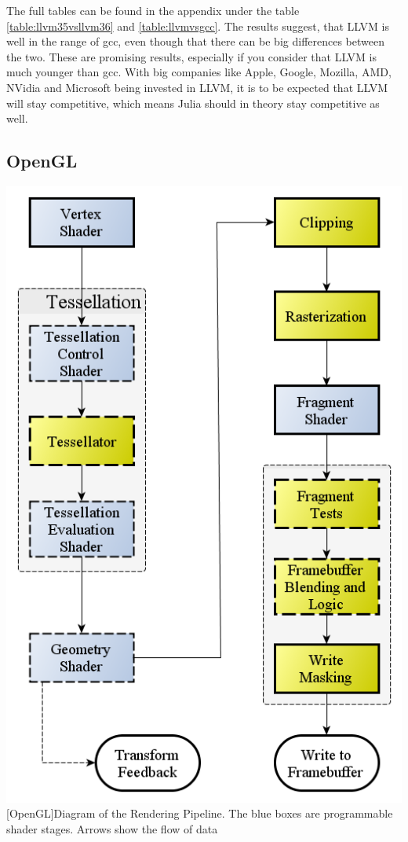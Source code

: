 The full tables can be found in the appendix under the table \ref{table:llvm35vsllvm36} and \ref{table:llvmvsgcc}.
The results suggest, that \ac{LLVM} is well in the range of \ac{gcc}, even though that there can be big differences between the two.
These are promising results, especially if you consider that \ac{LLVM} is much younger than \ac{gcc}. 
With big companies like Apple\cite{GoogleAppleLLVM}, Google\cite{GoogleAppleLLVM}, Mozilla\cite{Rust}, AMD\cite{LLVMAMD}, NVidia\cite{LLVMNvidia} and Microsoft\cite{MicrosoftLLVM} being invested in LLVM, it is to be expected that \ac{LLVM} will stay competitive, which means Julia should in theory stay competitive as well.


\subsection{\ac{OpenGL}}

\vspace{1em}
\begin{minipage}{\linewidth}
    \centering
    \includegraphics[width=0.5\linewidth]{graphics/RenderingPipeline.png}
    [OpenGL]{Diagram of the Rendering Pipeline. The blue boxes are programmable shader stages. Arrows show the flow of data\cite{OpenGLPipeline}}
    \label{fig:opengl}
\end{minipage}


